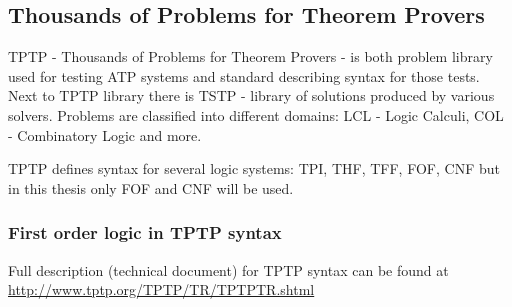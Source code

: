 \subsection{Thousands of Problems for Theorem Provers}

TPTP \cite{Sut17} - Thousands of Problems for Theorem Provers - is both problem library used for testing \gls{ATP} systems and standard describing syntax for those tests. Next to TPTP library there is \gls{TSTP} - library of solutions produced by various solvers. Problems are classified into different domains: LCL - Logic Calculi, COL - Combinatory Logic and more.

TPTP defines syntax for several logic systems: \gls{TPI}, \gls{THF}, \gls{TFF}, \gls{FOF}, \gls{CNF} but in this thesis only \gls{FOF} and \gls{CNF} will be used.

\subsubsection{First order logic in TPTP syntax}

Full description (technical document) for TPTP syntax can be found at \url{http://www.tptp.org/TPTP/TR/TPTPTR.shtml}

